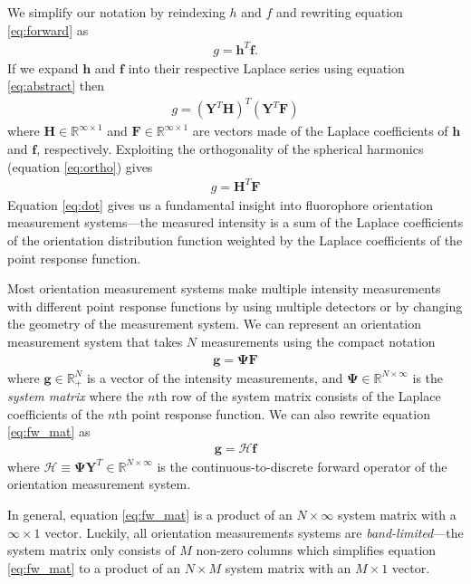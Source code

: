 \documentclass[10pt]{article}
\providecommand{\mb}[1]{\mathbf{#1}}
\providecommand{\mbb}[1]{\mathbb{#1}}
\begin{document}
We simplify our notation by reindexing $h$ and $f$ and rewriting equation
\ref{eq:forward} as
\begin{align}
  g = \mb{h}^T\mb{f}. 
\end{align}
If we expand $\mb{h}$ and $\mb{f}$ into their respective Laplace series using equation
\ref{eq:abstract} then
\begin{align}
  g = (\mb{Y}^T\mb{H})^T(\mb{Y}^T\mb{F})
\end{align}
where $\mb{H} \in \mbb{R}^{\infty\times 1}$ and
$\mb{F} \in \mbb{R}^{\infty \times 1}$ are vectors made of the Laplace
coefficients of $\mb{h}$ and $\mb{f}$, respectively. Exploiting the
orthogonality of the spherical harmonics (equation \ref{eq:ortho}) gives
\begin{align}
  g = \mb{H}^T\mb{F} \label{eq:dot}
\end{align}
Equation \ref{eq:dot} gives us a fundamental insight into fluorophore
orientation measurement systems---the measured intensity is a sum of the Laplace
coefficients of the orientation distribution function weighted by the Laplace
coefficients of the point response function.

Most orientation measurement systems make multiple intensity measurements with
different point response functions by using multiple detectors or by changing
the geometry of the measurement system. We can represent an orientation
measurement system that takes $N$ measurements using the compact notation
\begin{align}
  \mb{g} = \mb{\Psi}\mb{F} \label{eq:fw_mat}
\end{align}
where $\mb{g} \in \mathbb{R}^N_+$ is a vector of the intensity measurements,
and $\mb{\Psi} \in \mbb{R}^{N\times \infty}$ is the \textit{system matrix}
where the $n$th row of the system matrix consists of the Laplace coefficients of
the $n$th point response function. We can also rewrite equation \ref{eq:fw_mat}
as
\begin{align}
  \mb{g} = \mathcal{H}\mb{f}
\end{align}
where $\mathcal{H} \equiv \mb{\Psi}\mb{Y}^T \in \mbb{R}^{N\times \infty}$ is the 
continuous-to-discrete forward operator of the orientation measurement system. 

In general, equation \ref{eq:fw_mat} is a product of an $N\times \infty$ system
matrix with a $\infty \times 1$ vector. Luckily, all orientation measurements
systems are \textit{band-limited}---the system matrix only consists of $M$
non-zero columns which simplifies equation \ref{eq:fw_mat} to a product of an
$N\times M$ system matrix with an $M \times 1$ vector.
\end{document}
